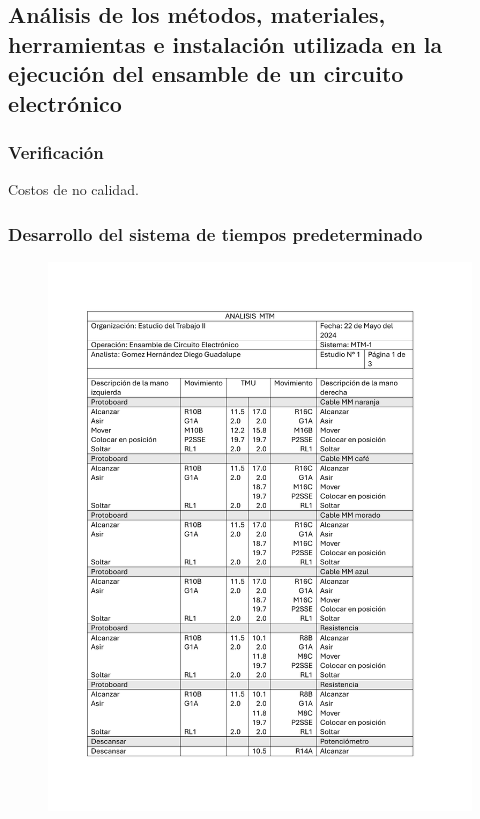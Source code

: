 \subsection{Análisis de los métodos, materiales, herramientas e instalación utilizada en la ejecución del ensamble de un circuito electrónico}

\subsubsection{Verificación}

Costos de no calidad.
% 
% 
\subsubsection{Desarrollo del sistema de tiempos predeterminado}
% 
\begin{figure}[H]
    \centering
    \includegraphics[scale=0.21]{13/img/analisMtmUno.pdf}
    \centering

\end{figure}
